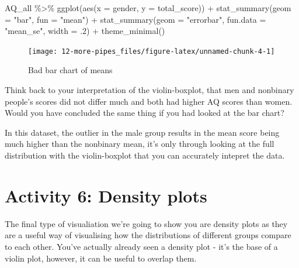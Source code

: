 \documentclass[
  oneside]{book}
\newenvironment{Shaded}{\begin{snugshade}}{\end{snugshade}}
\newcommand{\AttributeTok}[1]{\textcolor[rgb]{0.77,0.63,0.00}{#1}}
\newcommand{\DecValTok}[1]{\textcolor[rgb]{0.00,0.00,0.81}{#1}}
\newcommand{\FunctionTok}[1]{\textcolor[rgb]{0.00,0.00,0.00}{#1}}
\newcommand{\NormalTok}[1]{#1}
\newcommand{\SpecialCharTok}[1]{\textcolor[rgb]{0.00,0.00,0.00}{#1}}
\newcommand{\StringTok}[1]{\textcolor[rgb]{0.31,0.60,0.02}{#1}}
\begin{document}
\begin{Shaded}
\begin{Highlighting}[]
\NormalTok{AQ\_all }\SpecialCharTok{\%\textgreater{}\%}
  \FunctionTok{ggplot}\NormalTok{(}\FunctionTok{aes}\NormalTok{(}\AttributeTok{x =}\NormalTok{ gender, }\AttributeTok{y =}\NormalTok{ total\_score)) }\SpecialCharTok{+}
  \FunctionTok{stat\_summary}\NormalTok{(}\AttributeTok{geom =} \StringTok{"bar"}\NormalTok{, }\AttributeTok{fun =} \StringTok{"mean"}\NormalTok{) }\SpecialCharTok{+}
  \FunctionTok{stat\_summary}\NormalTok{(}\AttributeTok{geom =} \StringTok{"errorbar"}\NormalTok{, }\AttributeTok{fun.data =} \StringTok{"mean\_se"}\NormalTok{, }\AttributeTok{width =}\NormalTok{ .}\DecValTok{2}\NormalTok{) }\SpecialCharTok{+}
  \FunctionTok{theme\_minimal}\NormalTok{()}
\end{Highlighting}
\end{Shaded}

\begin{figure}

{\centering \texttt{[image: 12-more-pipes\_files/figure-latex/unnamed-chunk-4-1]} 

}

\caption{Bad bar chart of means}\label{fig:unnamed-chunk-4}
\end{figure}

Think back to your interpretation of the violin-boxplot, that men and nonbinary people's scores did not differ much and both had higher AQ scores than women. Would you have concluded the same thing if you had looked at the bar chart?

In this dataset, the outlier in the male group results in the mean score being much higher than the nonbinary mean, it's only through looking at the full distribution with the violin-boxplot that you can accurately intepret the data.

\hypertarget{activity-6-density-plots}{%
\section{Activity 6: Density plots}\label{activity-6-density-plots}}

The final type of visualiation we're going to show you are density plots as they are a useful way of visualising how the distributions of different groups compare to each other. You've actually already seen a density plot - it's the base of a violin plot, however, it can be useful to overlap them.
\end{document}
